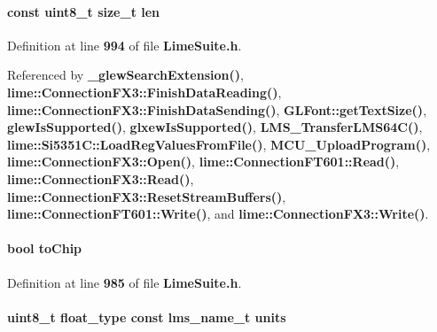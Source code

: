 \paragraph[{len}]{\setlength{\rightskip}{0pt plus 5cm}const uint8\+\_\+t size\+\_\+t len}\label{group__FN__LOW__LVL_gab8d2afc6ea251b08f3a2774565c57d5b}


Definition at line {\bf 994} of file {\bf Lime\+Suite.\+h}.



Referenced by {\bf \+\_\+glew\+Search\+Extension()}, {\bf lime\+::\+Connection\+F\+X3\+::\+Finish\+Data\+Reading()}, {\bf lime\+::\+Connection\+F\+X3\+::\+Finish\+Data\+Sending()}, {\bf G\+L\+Font\+::get\+Text\+Size()}, {\bf glew\+Is\+Supported()}, {\bf glxew\+Is\+Supported()}, {\bf L\+M\+S\+\_\+\+Transfer\+L\+M\+S64\+C()}, {\bf lime\+::\+Si5351\+C\+::\+Load\+Reg\+Values\+From\+File()}, {\bf M\+C\+U\+\_\+\+Upload\+Program()}, {\bf lime\+::\+Connection\+F\+X3\+::\+Open()}, {\bf lime\+::\+Connection\+F\+T601\+::\+Read()}, {\bf lime\+::\+Connection\+F\+X3\+::\+Read()}, {\bf lime\+::\+Connection\+F\+X3\+::\+Reset\+Stream\+Buffers()}, {\bf lime\+::\+Connection\+F\+T601\+::\+Write()}, and {\bf lime\+::\+Connection\+F\+X3\+::\+Write()}.

\paragraph[{to\+Chip}]{\setlength{\rightskip}{0pt plus 5cm}bool to\+Chip}\label{group__FN__LOW__LVL_gac0d1eb9430e79d6b54910de95b9be2d0}


Definition at line {\bf 985} of file {\bf Lime\+Suite.\+h}.

\paragraph[{units}]{\setlength{\rightskip}{0pt plus 5cm}uint8\+\_\+t {\bf float\+\_\+type} const {\bf lms\+\_\+name\+\_\+t} units}\label{group__FN__LOW__LVL_ga0e16e28feec832005ce31f9f2671d161}


